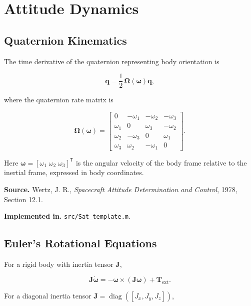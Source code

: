 \documentclass[11pt]{article}
\newcommand{\vect}[1]{\boldsymbol{#1}}
\newcommand{\transpose}{\mathsf{T}}
\newcommand{\diag}{\operatorname{diag}}
\begin{document}
\section{Attitude Dynamics}

\subsection{Quaternion Kinematics}

The time derivative of the quaternion representing body orientation is

\begin{equation}
\dot{\vect{q}} = \frac{1}{2}\,\mathbf{\Omega}(\vect{\omega})\vect{q},
\end{equation}

where the quaternion rate matrix is

\begin{equation}
\mathbf{\Omega}(\vect{\omega}) =
\begin{bmatrix}
0 & -\omega_1 & -\omega_2 & -\omega_3 \\
\omega_1 & 0 & \omega_3 & -\omega_2 \\
\omega_2 & -\omega_3 & 0 & \omega_1 \\
\omega_3 & \omega_2 & -\omega_1 & 0
\end{bmatrix}.
\end{equation}

Here $\vect{\omega} = [\omega_1\; \omega_2\; \omega_3]^\transpose$ is
the angular velocity of the body frame relative to the inertial frame,
expressed in body coordinates.

\textbf{Source.} Wertz, J. R., \emph{Spacecraft Attitude Determination and
Control}, 1978, Section 12.1.

\textbf{Implemented in.} \texttt{src/Sat\_template.m}.

\subsection{Euler's Rotational Equations}

For a rigid body with inertia tensor $\mathbf{J}$,

\begin{equation}
\mathbf{J}\dot{\vect{\omega}} = -\vect{\omega} \times (\mathbf{J}\vect{\omega}) + \vect{T}_{\mathrm{ext}}.
\end{equation}

For a diagonal inertia tensor $\mathbf{J} = \diag([J_x, J_y, J_z])$,
\end{document}
